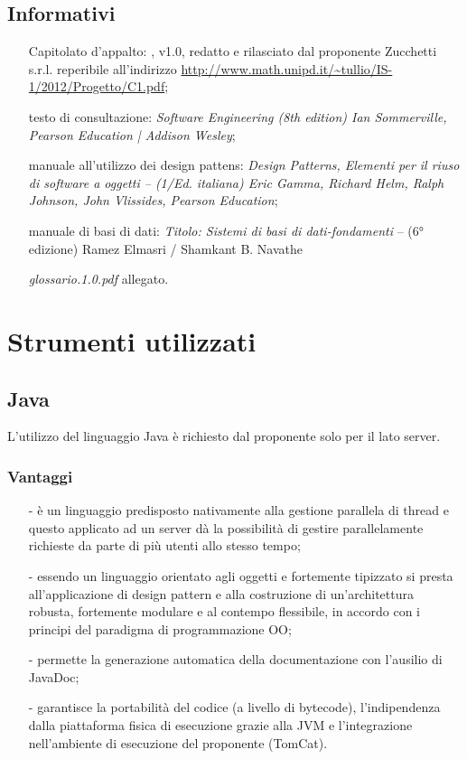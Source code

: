 \subsection{Informativi}
\begin{itemize}
\item[] Capitolato d'appalto: \caName{}, v1.0, redatto e rilasciato dal proponente Zucchetti s.r.l. reperibile all'indirizzo \url{http://www.math.unipd.it/~tullio/IS-1/2012/Progetto/C1.pdf};
\item[] testo di consultazione: \textit{Software Engineering (8th edition) Ian Sommerville, Pearson Education | Addison Wesley};
\item[] manuale all'utilizzo dei design pattens: \textit{Design Patterns, Elementi per il riuso di software a oggetti -- (1/Ed. italiana) Eric Gamma, Richard Helm, Ralph Johnson, John Vlissides, Pearson Education};
\item[] manuale di basi di dati: \textit{Titolo: Sistemi di basi di dati-fondamenti} -- (6° edizione) Ramez Elmasri / Shamkant B. Navathe
\item[] \textit{glossario.1.0.pdf} allegato.
\end{itemize}
\clearpage

\section{Strumenti utilizzati}
\subsection{Java}
L'utilizzo del linguaggio Java è richiesto dal proponente solo per il lato server.

\subsubsection*{Vantaggi}
\begin{itemize}
\item[-] è un linguaggio predisposto nativamente alla gestione parallela di thread e questo applicato ad un server dà la possibilità di gestire parallelamente richieste da parte di più utenti allo stesso tempo;
\item[-] essendo un linguaggio orientato agli oggetti e fortemente tipizzato si presta all'applicazione di design pattern e alla costruzione di un'architettura robusta, fortemente modulare e al contempo flessibile, in accordo con i principi del paradigma di programmazione OO;
\item[-] permette la generazione automatica della documentazione con l'ausilio di JavaDoc;
\item[-] garantisce la portabilità del codice (a livello di bytecode), l'indipendenza dalla piattaforma fisica di esecuzione grazie alla JVM e l'integrazione nell'ambiente di esecuzione del proponente (TomCat).
\end{itemize}
